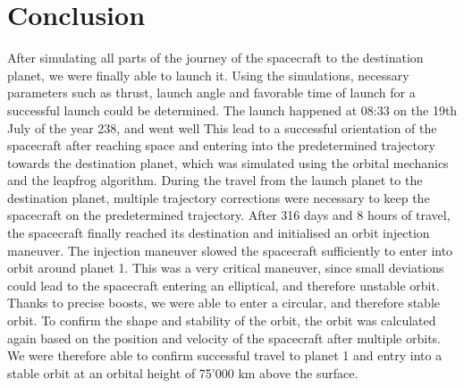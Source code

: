 \documentclass[reprint,english,notitlepage]{revtex4-2}
\begin{document}
\section{Conclusion} \label{sec: conclusion}
    After simulating all parts of the journey of the spacecraft to the destination planet, we were finally able to launch it.
    Using the simulations, necessary parameters such as thrust, launch angle and favorable time of launch for a successful launch could be determined.
    The launch happened at 08:33 on the 19th July of the year 238, and went well
    This lead to a successful orientation of the spacecraft after reaching space and entering into the predetermined trajectory towards the destination planet, which was simulated using the orbital mechanics and the leapfrog algorithm.
    During the travel from the launch planet to the destination planet, multiple trajectory corrections were necessary to keep the spacecraft on the predetermined trajectory.
    After 316 days and 8 hours of travel, the spacecraft finally reached its destination and initialised an orbit injection maneuver.
    The injection maneuver slowed the spacecraft sufficiently to enter into orbit around planet 1.
    This was a very critical maneuver, since small deviations could lead to the spacecraft entering an elliptical, and therefore unstable orbit.
    Thanks to precise boosts, we were able to enter a circular, and therefore stable orbit.
    To confirm the shape and stability of the orbit, the orbit was calculated again based on the position and velocity of the spacecraft after multiple orbits.
    We were therefore able to confirm successful travel to planet 1 and entry into a stable orbit at an orbital height of 75'000 km above the surface.


\newpage
\end{document}
